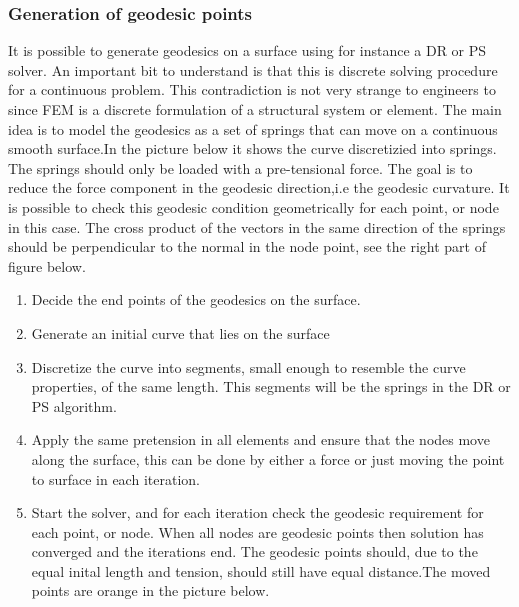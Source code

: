 \subsubsection{Generation of geodesic points}
It is possible to generate geodesics on a surface using for instance a DR or PS solver. An important bit to understand is that this is discrete solving procedure for a continuous problem. This contradiction is not very strange to engineers to since FEM is a discrete formulation of a structural system or element. The main idea is to model the geodesics as a set of springs that can move on a continuous smooth surface.In the picture below it shows the curve discretizied into springs. The springs should only be loaded with a pre-tensional force. The goal is to reduce the force component in the geodesic direction,i.e the geodesic curvature. It is possible to check this geodesic condition geometrically for each point, or node in this case. The cross product of the vectors in the same direction of the springs  should be perpendicular to the normal in the node point, see the right part of figure below.




\vspace{5mm}


\begin{enumerate}
\item Decide the end points of the geodesics on the surface.
\item Generate an initial curve that lies on the surface




\item Discretize  the curve into segments, small enough to resemble the curve properties, of the same length. This segments will be the springs in the DR or PS algorithm.



\item Apply the same pretension in all elements and ensure that the nodes move along the surface, this can be done by either a force or just moving the point to surface in each iteration. 
\item Start the solver, and for each iteration check the geodesic requirement for each point, or node. When all nodes are geodesic points then solution has converged and the iterations end. The geodesic points should, due to the equal inital length and tension, should still have equal distance.The moved points are orange in the picture below.


\end{enumerate}

